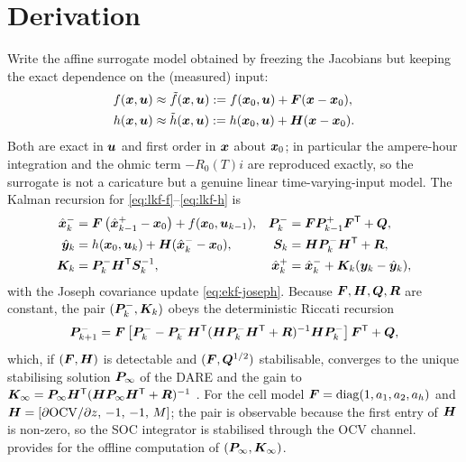 \section{Derivation}
Write the affine surrogate model obtained by freezing the Jacobians but keeping the exact
dependence on the (measured) input:
\begin{align}
f(\bm{x},\bm{u}) &\approx \tilde f(\bm{x},\bm{u}) := f(\bm{x}_0,\bm{u}) + \bm{F}(\bm{x} - \bm{x}_0), \label{eq:lkf-f}\\
h(\bm{x},\bm{u}) &\approx \tilde h(\bm{x},\bm{u}) := h(\bm{x}_0,\bm{u}) + \bm{H}(\bm{x} - \bm{x}_0). \label{eq:lkf-h}
\end{align}
Both are exact in $\bm{u}$ and first order in $\bm{x}$ about $\bm{x}_0$; in particular the
ampere-hour integration and the ohmic term $-R_0(T)i$ are reproduced exactly, so the
surrogate is not a caricature but a genuine linear time-varying-input model. The Kalman
recursion for \eqref{eq:lkf-f}--\eqref{eq:lkf-h} is
\begin{align}
\hat{\bm{x}}^{-}_k &= \bm{F}\left(\hat{\bm{x}}^{+}_{k-1} - \bm{x}_0\right) + f(\bm{x}_0, \bm{u}_{k-1}), &
\bm{P}^{-}_k &= \bm{F}\bm{P}^{+}_{k-1}\bm{F}^{\mathsf{T}} + \bm{Q}, \label{eq:lkf-tu}\\
\hat{\bm{y}}_k &= h(\bm{x}_0,\bm{u}_k) + \bm{H}(\hat{\bm{x}}^{-}_k - \bm{x}_0), &
\bm{S}_k &= \bm{H}\bm{P}^{-}_k\bm{H}^{\mathsf{T}} + \bm{R}, \label{eq:lkf-ypred}\\
\bm{K}_k &= \bm{P}^{-}_k\bm{H}^{\mathsf{T}}\bm{S}_k^{-1}, &
\hat{\bm{x}}^{+}_k &= \hat{\bm{x}}^{-}_k + \bm{K}_k(\bm{y}_k - \hat{\bm{y}}_k), \label{eq:lkf-gain}
\end{align}
with the Joseph covariance update \eqref{eq:ekf-joseph}. Because $\bm{F},\bm{H},\bm{Q},\bm{R}$ are
constant, the pair $(\bm{P}^{-}_k,\bm{K}_k)$ obeys the deterministic Riccati recursion
\begin{equation}
\bm{P}^{-}_{k+1} = \bm{F}\left[\bm{P}^{-}_k - \bm{P}^{-}_k\bm{H}^{\mathsf{T}}(\bm{H}\bm{P}^{-}_k\bm{H}^{\mathsf{T}}+\bm{R})^{-1} \bm{H}\bm{P}^{-}_k\right]\bm{F}^{\mathsf{T}} + \bm{Q},
\label{eq:lkf-riccati}
\end{equation}
which, if $(\bm{F},\bm{H})$ is detectable and $(\bm{F},\bm{Q}^{1/2})$ stabilisable, converges to the
unique stabilising solution $\bm{P}_\infty$ of the DARE and the gain to
$\bm{K}_\infty = \bm{P}_\infty\bm{H}^{\mathsf{T}}(\bm{H}\bm{P}_\infty\bm{H}^{\mathsf{T}}+\bm{R})^{-1}$
\cite[Ch.~4]{andersonmoore1979}. For the cell model $\bm{F}=\operatorname{diag}(1,a_1,a_2,a_h)$ and
$\bm{H}=[\partial\mathrm{OCV}/\partial z,\,-1,\,-1,\,M]$; the pair is observable because the first
entry of $\bm{H}$ is non-zero, so the SOC integrator is stabilised through the OCV channel.
 provides  for the offline computation of
$(\bm{P}_\infty,\bm{K}_\infty)$.

